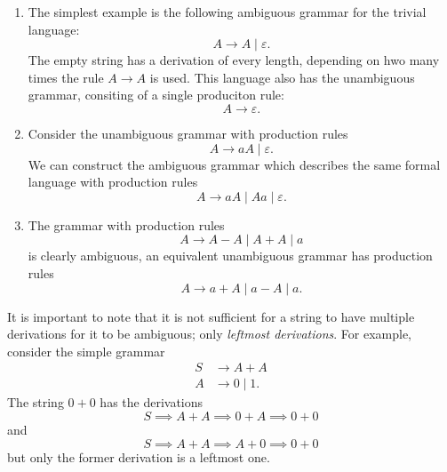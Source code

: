 \begin{example}
    \hfill
    \begin{enumerate}
        \item 
            The simplest example is the following ambiguous grammar for
            the trivial language:
            \[
                A \to A \mid \varepsilon.
            \]
            The empty string has a derivation of every length,
            depending on hwo many times the rule $A \to A$ is used.
            This language also has the unambiguous grammar, 
            consiting of a single produciton rule:
            \[
                A \to \varepsilon.
            \]

        \item
            Consider the unambiguous grammar with production rules
            \[
                A \to aA \mid \varepsilon.
            \]
            We can construct the ambiguous grammar which describes
            the same formal language with production rules
            \[
                A \to aA \mid Aa \mid \varepsilon.
            \]

        \item
            The grammar with production rules
            \[
                A \to A - A \mid A + A \mid a
            \]
            is clearly ambiguous,
            an equivalent unambiguous grammar has production rules
            \[
                A \to a + A \mid a - A \mid a.
            \]
    \end{enumerate}
\end{example}

\begin{remark}
    It is important to note that it is not sufficient for a string
    to have multiple derivations for it to be ambiguous;
    only \emph{leftmost derivations}.
    For example, consider the simple grammar
    \begin{align*}
        S &\to A + A \\
        A &\to 0 \mid 1.
    \end{align*}
    The string $0 + 0$ has the derivations
    \[
        S \implies A + A \implies 0 + A \implies 0 + 0
    \]
    and
    \[
        S \implies A + A \implies A + 0 \implies 0 + 0
    \]
    but only the former derivation is a leftmost one.
\end{remark}

